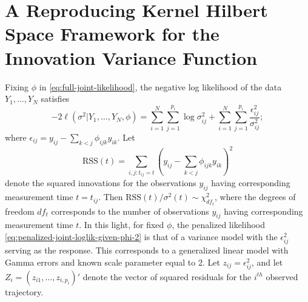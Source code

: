 
\section{A Reproducing Kernel Hilbert Space Framework for the Innovation Variance Function} \label{chapter-3-IV-modeling-section}

Fixing $\phi$ in \eqref{eq:full-joint-likelihood}, the negative log likelihood of the data $Y_1,\dots, Y_N$ satisfies
\begin{equation} \label{eq:penalized-joint-loglik-given-phi-2}
-2\ell\left(\sigma^2 \vert Y_1,\dots, Y_N ,\phi \right) =  \sum_{i = 1}^N \sum_{j = 1}^{p_i} \log \sigma^2_{ij}  + \sum_{i = 1}^N \sum_{j = 1}^{p_i} \frac {\epsilon_{ij}^2}{\sigma^2_{ij}};
\end{equation}
\noindent
where $\epsilon_{ij} =  y_{ij} - \sum_{k<j} \phi_{ijk} y_{ik}$. Let 
\begin{equation}
\mbox{RSS}\left( t \right) = \sum_{i,j:t_{ij}= t} \left( y_{ij} - \sum_{k<j} \phi_{ijk} y_{ik}\right)^2
\end{equation}
\noindent
denote the squared innovations for the observations $y_{ij}$ having corresponding measurement time $t = t_{ij}$. Then $\mbox{RSS}\left( t \right)/\sigma^2\left(t\right) \sim \chi^2_{df_t}$, where the degrees of freedom $df_{t}$ corresponds to the number of observations $y_{ij}$ having corresponding measurement time $t$. In this light, for fixed $\phi$, the penalized likelihood \eqref{eq:penalized-joint-loglik-given-phi-2} is that of a variance model with the $\epsilon_{ij}^2$ serving as the response.  This corresponds to a generalized linear model with Gamma errors and known scale parameter equal to 2. Let $z_{ij} = \epsilon_{ij}^2$, and let $Z_{i} = \left(z_{i1},\dots, z_{i,p_i} \right)'$ denote the vector of squared residuals for the $i^{th}$ observed trajectory. 

\bigskip

